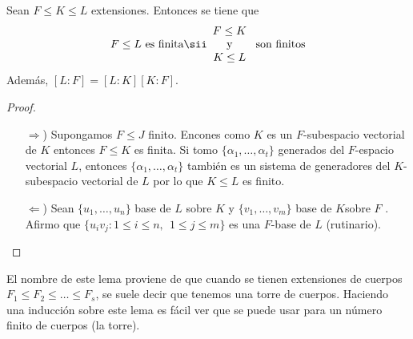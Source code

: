 \begin{lema}[de la torre]
    Sean $F \leq K \leq L$ extensiones. Entonces se tiene que 
    \begin{gather*}
        F \leq L \text{ es finita} \sii 
        \begin{array}{c}
            F \leq K\\
            \text{ y }\\
            K\leq L
        \end{array}
        \text{ son finitos}
    \end{gather*}
    Además, $[L:F] = [L:K][K:F]$.

    \begin{proof}\
        \begin{itemize}
            \item[$\Rightarrow$)] Supongamos $F\leq J$ finito. Encones como $K$ es un $F$-subespacio vectorial de $K$ entonces $F\leq K$ es finita. Si tomo $\{\alpha_1, \dots, \alpha_t\}$ generados del $F$-espacio vectorial $L$, entonces $\{\alpha_1, \dots, \alpha_t\}$ también es un sistema de generadores del $K$-subespacio vectorial de $L$ por lo que $K\leq L$ es finito.

            \item[$\Leftarrow$)] Sean $\{u_1, \dots, u_n\}$ base de $L$ sobre $K$ y $\{v_1, \dots, v_m\}$ base de $K$sobre $F$ . Afirmo que $\{u_iv_j: 1 \leq i \leq n,\ \ 1\leq j \leq m\}$ es una $F$-base de $L$ (rutinario).
        \end{itemize}
    \end{proof}
\end{lema}

El nombre de este lema proviene de que cuando se tienen extensiones de cuerpos $F_1\leq F_2\leq \dots \leq F_s$, se suele decir que tenemos una torre de cuerpos. Haciendo una inducción sobre este lema es fácil ver que se puede usar para un número finito de cuerpos (la torre).

